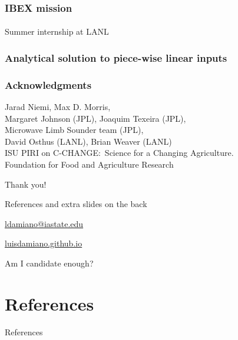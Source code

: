\documentclass{snedecorbeamer}
\begin{document}
\begin{frame}
  \frametitle{IBEX mission}
  \framesubtitle{}

  Summer internship at LANL
\end{frame}

\begin{frame}
  \frametitle{Analytical solution to piece-wise linear inputs}
  \framesubtitle{}

\end{frame}

\begin{frame}[c]
  \frametitle{Acknowledgments}
  \centering

  {\small Jarad Niemi, Max D. Morris,\\
    Margaret Johnson (JPL), Joaquim Texeira (JPL), \\
    Microwave Limb Sounder team (JPL),\\
    David Osthus (LANL), Brian Weaver (LANL) \\
    ISU PIRI on C-CHANGE:~Science for a Changing Agriculture.\\
    Foundation for Food and Agriculture Research}

  \vfill

  {\huge Thank you!}

  \vfill

  {\tiny References and extra slides on the back}

  \href{ldamiano@iastate.edu}{
    ldamiano@iastate.edu}

  \href{https://luisdamiano.github.io/}{
    luisdamiano.github.io}

  \vfill

  {\tiny Am I candidate enough?}

\end{frame}

\appendix

\section{References}


\begin{frame}[allowframebreaks]{References}
  \tiny
  
  
\end{frame}
\end{document}
